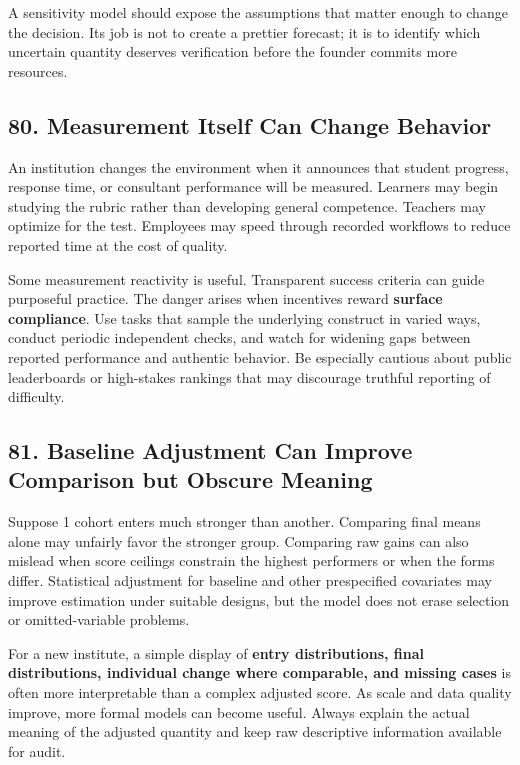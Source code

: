 A sensitivity model should expose the assumptions that matter enough to change the decision. Its job is not to create a prettier forecast; it is to identify which uncertain quantity deserves verification before the founder commits more resources.

\subsection*{80. Measurement Itself Can Change Behavior}

An institution changes the environment when it announces that student progress, response time, or consultant performance will be measured. Learners may begin studying the rubric rather than developing general competence. Teachers may optimize for the test. Employees may speed through recorded workflows to reduce reported time at the cost of quality.

Some measurement reactivity is useful. Transparent success criteria can guide purposeful practice. The danger arises when incentives reward \textbf{surface compliance}. Use tasks that sample the underlying construct in varied ways, conduct periodic independent checks, and watch for widening gaps between reported performance and authentic behavior. Be especially cautious about public leaderboards or high-stakes rankings that may discourage truthful reporting of difficulty.

\subsection*{81. Baseline Adjustment Can Improve Comparison but Obscure Meaning}

Suppose 1 cohort enters much stronger than another. Comparing final means alone may unfairly favor the stronger group. Comparing raw gains can also mislead when score ceilings constrain the highest performers or when the forms differ. Statistical adjustment for baseline and other prespecified covariates may improve estimation under suitable designs, but the model does not erase selection or omitted-variable problems.

For a new institute, a simple display of \textbf{entry distributions, final distributions, individual change where comparable, and missing cases} is often more interpretable than a complex adjusted score. As scale and data quality improve, more formal models can become useful. Always explain the actual meaning of the adjusted quantity and keep raw descriptive information available for audit.

